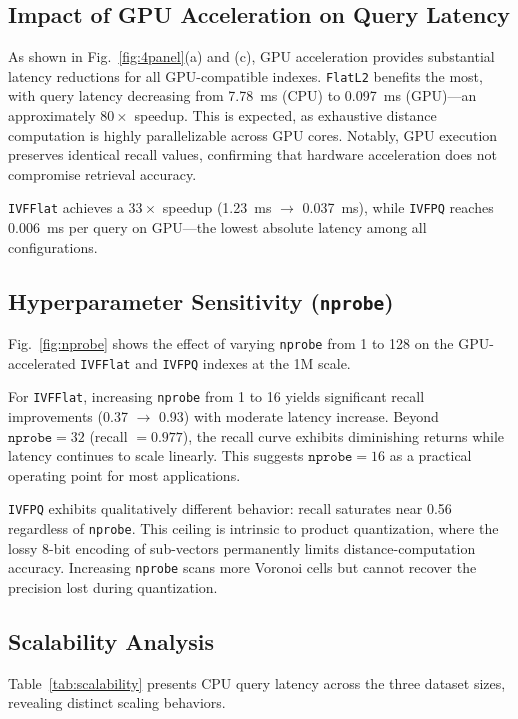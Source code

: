 \documentclass[conference]{IEEEtran}
\begin{document}
\subsection{Impact of GPU Acceleration on Query Latency}
As shown in Fig.~\ref{fig:4panel}(a) and (c), GPU acceleration provides substantial latency reductions for all GPU-compatible indexes. \texttt{FlatL2} benefits the most, with query latency decreasing from 7.78~ms (CPU) to 0.097~ms (GPU)---an approximately $80\times$ speedup. This is expected, as exhaustive distance computation is highly parallelizable across GPU cores. Notably, GPU execution preserves identical recall values, confirming that hardware acceleration does not compromise retrieval accuracy.

\texttt{IVFFlat} achieves a $33\times$ speedup (1.23~ms $\to$ 0.037~ms), while \texttt{IVFPQ} reaches 0.006~ms per query on GPU---the lowest absolute latency among all configurations.

\subsection{Hyperparameter Sensitivity (\texttt{nprobe})}
Fig.~\ref{fig:nprobe} shows the effect of varying \texttt{nprobe} from 1 to 128 on the GPU-accelerated \texttt{IVFFlat} and \texttt{IVFPQ} indexes at the 1M scale.

For \texttt{IVFFlat}, increasing \texttt{nprobe} from 1 to 16 yields significant recall improvements (0.37 $\to$ 0.93) with moderate latency increase. Beyond $\texttt{nprobe}=32$ (recall $= 0.977$), the recall curve exhibits diminishing returns while latency continues to scale linearly. This suggests $\texttt{nprobe}=16$ as a practical operating point for most applications.

\texttt{IVFPQ} exhibits qualitatively different behavior: recall saturates near 0.56 regardless of \texttt{nprobe}. This ceiling is intrinsic to product quantization, where the lossy 8-bit encoding of sub-vectors permanently limits distance-computation accuracy. Increasing \texttt{nprobe} scans more Voronoi cells but cannot recover the precision lost during quantization.

\subsection{Scalability Analysis}
Table~\ref{tab:scalability} presents CPU query latency across the three dataset sizes, revealing distinct scaling behaviors.
\end{document}
